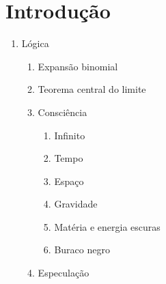 \section*{Introdução}
\lipsum[1] \cite{brasilescola_parmenides}

\begin{enumerate}[label*=\arabic*.]
   \item Lógica
   \begin{enumerate}[label*=\arabic*.]
   \item Expansão binomial
   \item Teorema central do limite
   \item Consciência
   \begin{enumerate}[label*=\arabic*.]
   \item Infinito
   \item Tempo
   \item Espaço
   \item Gravidade
   \item Matéria e energia escuras
   \item Buraco negro
   \end{enumerate}   
   \item Especulação
   \end{enumerate}
\end{enumerate}